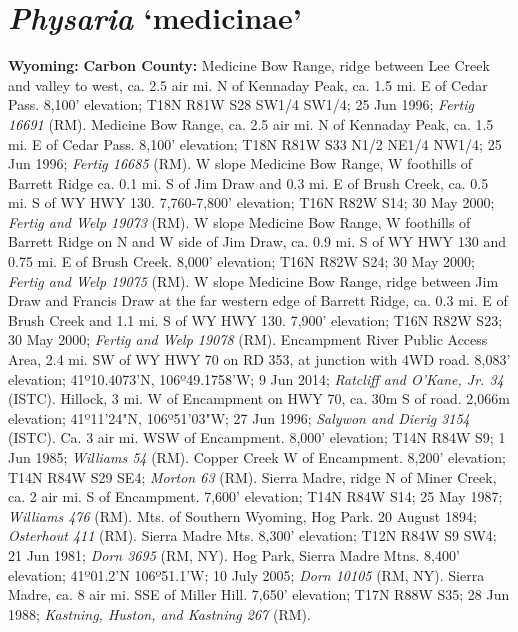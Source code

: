 
\section*{\textit{Physaria} ‘medicinae’}

  \textbf{Wyoming:}
  \textbf{Carbon County:}
Medicine Bow Range, ridge between Lee Creek and valley to west, ca. 2.5 air mi.
N of Kennaday Peak, ca. 1.5 mi. E of Cedar Pass. 8,100' elevation; T18N R81W S28
SW1/4 SW1/4; 25 Jun 1996; \textit{Fertig 16691} (RM).
Medicine Bow Range, ca. 2.5 air mi. N of Kennaday Peak, ca. 1.5 mi. E of
Cedar Pass. 8,100’ elevation; T18N R81W S33 N1/2 NE1/4 NW1/4; 25 Jun 1996;
\textit{Fertig 16685} (RM).
W slope Medicine Bow Range, W foothills of Barrett Ridge ca. 0.1 mi. S of
Jim Draw and 0.3 mi. E of Brush Creek, ca. 0.5 mi. S of WY HWY 130.
7,760-7,800’ elevation; T16N R82W S14; 30 May 2000;
\textit{Fertig and Welp 19073} (RM).
W slope Medicine Bow Range, W foothills of Barrett Ridge on N and W side of
Jim Draw, ca. 0.9 mi. S of WY HWY 130 and 0.75 mi. E of Brush Creek.
8,000’ elevation; T16N R82W S24; 30 May 2000;
\textit{Fertig and Welp 19075} (RM).
W slope Medicine Bow Range, ridge between Jim Draw and Francis Draw at the far
western edge of Barrett Ridge, ca. 0.3 mi. E of Brush Creek and 1.1 mi. S of WY
HWY 130. 7,900' elevation; T16N R82W S23; 30 May 2000;
\textit{Fertig and Welp 19078} (RM).
Encampment River Public Access Area, 2.4 mi. SW of WY HWY 70 on RD 353,
at junction with 4WD road. 8,083' elevation; 41º10.4073'N, 106º49.1758'W;
9 Jun 2014; \textit{Ratcliff and O'Kane, Jr. 34} (ISTC).
Hillock, 3 mi. W of Encampment on HWY 70, ca. 30m S of road. 2,066m elevation;
41º11'24"N, 106º51'03"W; 27 Jun 1996; \textit{Salywon and Dierig 3154} (ISTC).
Ca. 3 air mi. WSW of Encampment. 8,000' elevation; T14N R84W S9; 1 Jun 1985;
\textit{Williams 54} (RM).
Copper Creek W of Encampment. 8,200' elevation; T14N R84W S29 SE4;
\textit{Morton 63} (RM).
Sierra Madre, ridge N of Miner Creek, ca. 2 air mi. S of Encampment.
7,600' elevation; T14N R84W S14; 25 May 1987; \textit{Williams 476} (RM).
Mts. of Southern Wyoming, Hog Park. 20 August 1894; \textit{Osterhout 411} (RM).
Sierra Madre Mts. 8,300' elevation; T12N R84W S9 SW4; 21 Jun 1981;
\textit{Dorn 3695} (RM, NY).
Hog Park, Sierra Madre Mtns. 8,400' elevation; 41º01.2’N 106º51.1’W;
10 July 2005; \textit{Dorn 10105} (RM, NY).
Sierra Madre, ca. 8 air mi. SSE of Miller Hill. 7,650' elevation; T17N R88W S35;
28 Jun 1988; \textit{Kastning, Huston, and Kastning 267} (RM).

